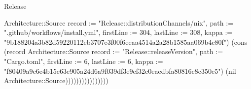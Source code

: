 \begin{lexlean}{Release}
\begin{semanticmodule}
{Architecture::Source {record := "Release::distributionChannels/nix", path := ".github/workflows/install.yml", firstLine := 304, lastLine := 308, kappa := "9b188204a3b82d59220112eb3707e3f00f6eeaa4514a2a28b1585aa069b4c80f"}) (cons (record Architecture::Source {record := "Release::releaseVersion", path := "Cargo.toml", firstLine := 6, lastLine := 6, kappa := "f80409a9c6e4b15e63e905a24d6a9f039df3e9ef32c0eaedbfa80816c8c350e5"}) (nil Architecture::Source))))))))))))))))
}
\end{semanticmodule}
\end{lexlean}
